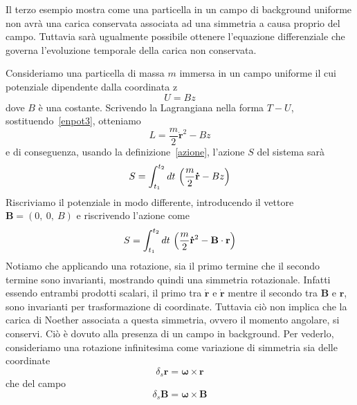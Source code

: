     Il terzo esempio mostra come una particella in un campo di background uniforme non avrà una carica conservata associata ad una simmetria a causa proprio del campo. Tuttavia sarà ugualmente possibile ottenere l'equazione differenziale che governa l'evoluzione temporale della carica non conservata.

    \begin{example}
        Consideriamo una particella di massa $m$ immersa in un campo uniforme il cui potenziale dipendente dalla coordinata z
    \begin{equation}\label{enpot3}
        U = B z
    \end{equation}
        dove $B$ è una costante. Scrivendo la Lagrangiana nella forma $T - U$, sostituendo~\eqref{enpot3}, otteniamo 
    \begin{equation} \label{lag3}
        L = \frac{m}{2} \mathbf{\dot r}^2 - B z
    \end{equation}
        e di conseguenza, usando la definizione~\eqref{azione}, l'azione $S$ del sistema sarà
    \begin{equation*}
        S = \int_{t_1}^{t_2}dt~ \Big( \frac{m}{2} \mathbf{\dot r} - B z \Big)
    \end{equation*}
        Riscriviamo il potenziale in modo differente, introducendo il vettore $\mathbf B = (0,~0,~B)$ e riscrivendo l'azione come
    \begin{equation*}
        S = \int_{t_1}^{t_2}dt~ \Big( \frac{m}{2} \mathbf{\dot r}^2 - \mathbf B \cdot \mathbf r \Big)
    \end{equation*}
        Notiamo che applicando una rotazione, sia il primo termine che il secondo termine sono invarianti, mostrando quindi una simmetria rotazionale. Infatti essendo entrambi prodotti scalari, il primo tra $\mathbf{\dot r}$ e $\mathbf{\dot r}$ mentre il secondo tra $\mathbf B$ e $\mathbf r$, sono invarianti per trasformazione di coordinate. Tuttavia ciò non implica che la carica di Noether associata a questa simmetria, ovvero il momento angolare, si conservi. Ciò è dovuto alla presenza di un campo in background. Per vederlo, consideriamo una rotazione infinitesima come variazione di simmetria sia delle coordinate 
    \begin{equation*}
        \delta_s \mathbf r = \boldsymbol \omega \times \mathbf r
    \end{equation*}
        che del campo
    \begin{equation*}
        \delta_s \mathbf B = \boldsymbol \omega \times \mathbf B
    \end{equation*}

\end{example}
